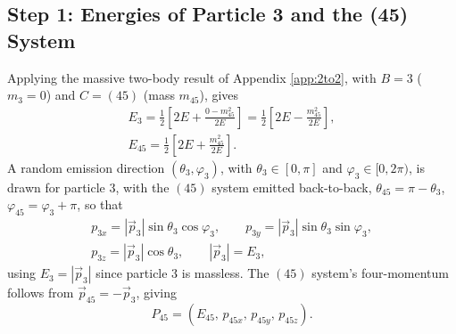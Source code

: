 \documentclass{article}
\begin{document}
\subsection{Step 1: Energies of Particle 3 and the (45) System}
Applying the massive two-body result of Appendix \ref{app:2to2}, with $B = 3$ ($m_3 = 0$) and $C = (45)$ (mass $m_{45}$), gives
\begin{equation}
\begin{gathered}
    E_3 = \frac{1}{2}\left[2E + \frac{0 - m_{45}^2}{2E}\right] = \frac{1}{2}\left[2E - \frac{m_{45}^2}{2E}\right], \\
    E_{45} = \frac{1}{2}\left[2E + \frac{m_{45}^2}{2E}\right].
\end{gathered}
\end{equation}
A random emission direction $(\theta_3, \varphi_3)$, with $\theta_3 \in [0,\pi]$ and $\varphi_3 \in [0, 2\pi)$, is drawn for particle 3, with the $(45)$ system emitted back-to-back, $\theta_{45} = \pi - \theta_3$, $\varphi_{45} = \varphi_3 + \pi$, so that
\begin{equation}
\begin{gathered}
    p_{3x} = |\vec{p}_3|\sin\theta_3\cos\varphi_3, \qquad p_{3y} = |\vec{p}_3|\sin\theta_3\sin\varphi_3, \\ p_{3z} = |\vec{p}_3|\cos\theta_3, \qquad |\vec{p}_3| = E_3,
\end{gathered}
\end{equation}
using $E_3 = |\vec{p}_3|$ since particle 3 is massless. The $(45)$ system's four-momentum follows from $\vec{p}_{45} = -\vec{p}_3$, giving
\begin{equation}
    P_{45} = (E_{45},\, p_{45x},\, p_{45y},\, p_{45z}).
\end{equation}
\end{document}
